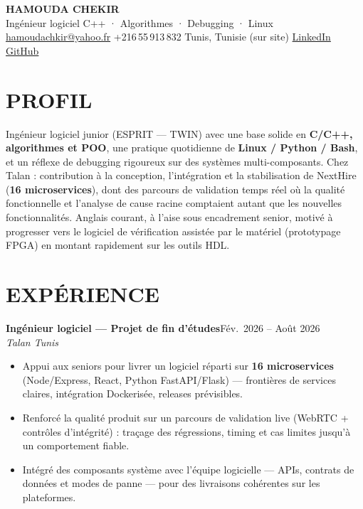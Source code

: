 \documentclass[10pt,a4paper]{article}
\newcommand{\TargetTitle}{Ingénieur logiciel \textbar{} C++ · Algorithmes · Debugging · Linux}
\newcommand{\job}[3]{%
  \textbf{\color{primary}#1}\hfill{\color{muted}\small #2}\\[-1pt]
  {\color{accent}\textit{#3}}\\[1pt]
  \begin{itemize}
}
\newcommand{\contactsep}{\hspace{4pt}{\color{rulecolor}|}\hspace{4pt}}
\begin{document}
{\fontsize{20}{24}\selectfont\bfseries\color{primary}HAMOUDA CHEKIR}\\[1pt]
{\normalsize\color{accent}\TargetTitle}\\[3pt]
{\footnotesize\color{muted}%
  \hspace{2pt}\href{mailto:hamoudachkir@yahoo.fr}{hamoudachkir@yahoo.fr}%
  \contactsep
  \hspace{2pt}+216\,55\,913\,832%
  \contactsep
  \hspace{2pt}Tunis, Tunisie (sur site)%
  \contactsep
  \hspace{2pt}\href{https://www.linkedin.com/in/hamouda-chekir-5053572b4}{LinkedIn}%
  \contactsep
  \hspace{2pt}\href{https://github.com/hamoudachekir}{GitHub}%
}\\[4pt]

\section{PROFIL}
Ingénieur logiciel junior (ESPRIT — TWIN) avec une base solide en \textbf{C/C++, algorithmes et POO}, une pratique quotidienne de \textbf{Linux / Python / Bash}, et un réflexe de debugging rigoureux sur des systèmes multi-composants.
Chez Talan : contribution à la conception, l'intégration et la stabilisation de NextHire (\textbf{16 microservices}), dont des parcours de validation temps réel où la qualité fonctionnelle et l'analyse de cause racine comptaient autant que les nouvelles fonctionnalités.
Anglais courant, à l'aise sous encadrement senior, motivé à progresser vers le logiciel de vérification assistée par le matériel (prototypage FPGA) en montant rapidement sur les outils HDL.

\section{EXPÉRIENCE}

\job{Ingénieur logiciel — Projet de fin d'études}{Fév.\ 2026 -- Août 2026}{Talan \textbar{} Tunis}
  \item Appui aux seniors pour livrer un logiciel réparti sur \textbf{16 microservices} (Node/Express, React, Python FastAPI/Flask) — frontières de services claires, intégration Dockerisée, releases prévisibles.
  \item Renforcé la qualité produit sur un parcours de validation live (WebRTC + contrôles d'intégrité) : traçage des régressions, timing et cas limites jusqu'à un comportement fiable.
  \item Intégré des composants système avec l'équipe logicielle — APIs, contrats de données et modes de panne — pour des livraisons cohérentes sur les plateformes.
\end{itemize}
\end{document}

